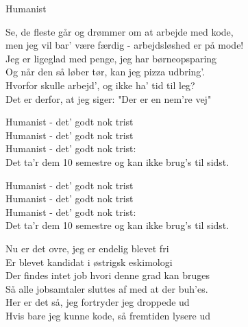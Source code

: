 \begin{song}{Humanist}

  \begin{SBVerse}
    Se, de fleste går og drømmer om at arbejde med kode,\\
    men jeg vil bar' være færdig - arbejdsløshed er på mode!\\
    Jeg er ligeglad med penge, jeg har børneopsparing\\
    Og når den så løber tør, kan jeg pizza udbring'.\\
    Hvorfor skulle arbejd', og ikke ha' tid til leg?\\
    Det er derfor, at jeg siger: "Der er en nem're vej"
  \end{SBVerse}

  \begin{SBChorus}
    Humanist - det' godt nok trist\\
    Humanist - det' godt nok trist\\
    Humanist - det' godt nok trist:\\
    Det ta'r dem 10 semestre og kan ikke brug's til sidst.
  \end{SBChorus}

  \begin{SBChorus}
    Humanist - det' godt nok trist\\
    Humanist - det' godt nok trist\\
    Humanist - det' godt nok trist:\\
    Det ta'r dem 10 semestre og kan ikke brug's til sidst.
  \end{SBChorus}



  \begin{SBVerse}
    Nu er det ovre, jeg er endelig blevet fri\\
    Er blevet kandidat i østrigsk eskimologi\\
    Der findes intet job hvori denne grad kan bruges\\
    Så alle jobsamtaler sluttes af med at der buh'es.\\
    Her er det så, jeg fortryder jeg droppede ud\\
    Hvis bare jeg kunne kode, så fremtiden lysere ud
  \end{SBVerse}


\end{song}
